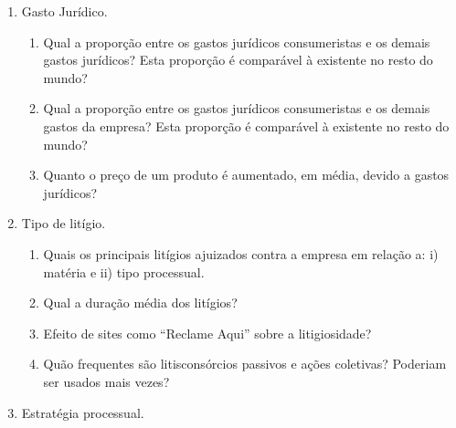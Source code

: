 \documentclass[]{report}
\providecommand{\tightlist}{%
  \setlength{\itemsep}{0pt}\setlength{\parskip}{0pt}}
\begin{document}
\begin{enumerate}
\def\labelenumi{\arabic{enumi}.}
\tightlist
\item
  Gasto Jurídico.

  \begin{enumerate}
  \def\labelenumii{\arabic{enumii}.}
  \tightlist
  \item
    Qual a proporção entre os gastos jurídicos consumeristas e os demais
    gastos jurídicos? Esta proporção é comparável à existente no resto
    do mundo?
  \item
    Qual a proporção entre os gastos jurídicos consumeristas e os demais
    gastos da empresa? Esta proporção é comparável à existente no resto
    do mundo?
  \item
    Quanto o preço de um produto é aumentado, em média, devido a gastos
    jurídicos?
  \end{enumerate}
\item
  Tipo de litígio.

  \begin{enumerate}
  \def\labelenumii{\arabic{enumii}.}
  \tightlist
  \item
    Quais os principais litígios ajuizados contra a empresa em relação
    a: i) matéria e ii) tipo processual.
  \item
    Qual a duração média dos litígios?
  \item
    Efeito de sites como ``Reclame Aqui'' sobre a litigiosidade?
  \item
    Quão frequentes são litisconsórcios passivos e ações coletivas?
    Poderiam ser usados mais vezes?
  \end{enumerate}
\item
  Estratégia processual.


\end{enumerate}
\end{document}
